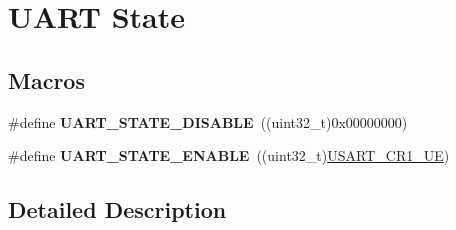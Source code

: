 \hypertarget{group___u_a_r_t___state}{\section{U\-A\-R\-T State}
\label{group___u_a_r_t___state}
}
\subsection*{Macros}
\begin{DoxyCompactItemize}
\item 
\hypertarget{group___u_a_r_t___state_gaf32492459be708981ebc5615194cdae9}{\#define {\bfseries U\-A\-R\-T\-\_\-\-S\-T\-A\-T\-E\-\_\-\-D\-I\-S\-A\-B\-L\-E}~((uint32\-\_\-t)0x00000000)}\label{group___u_a_r_t___state_gaf32492459be708981ebc5615194cdae9}

\item 
\hypertarget{group___u_a_r_t___state_gab6b470dccef2a518a45554b171acff5b}{\#define {\bfseries U\-A\-R\-T\-\_\-\-S\-T\-A\-T\-E\-\_\-\-E\-N\-A\-B\-L\-E}~((uint32\-\_\-t)\hyperlink{group___peripheral___registers___bits___definition_ga2bb650676aaae4a5203f372d497d5947}{U\-S\-A\-R\-T\-\_\-\-C\-R1\-\_\-\-U\-E})}\label{group___u_a_r_t___state_gab6b470dccef2a518a45554b171acff5b}

\end{DoxyCompactItemize}


\subsection{Detailed Description}
